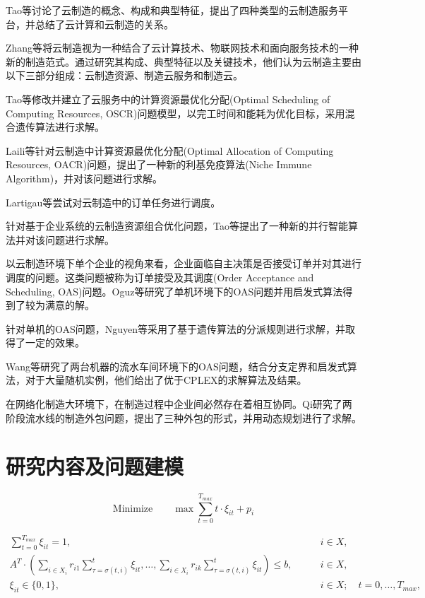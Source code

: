 \documentclass[UTF8]{ctexart}
\begin{document}
Tao等\cite{Tao2011}讨论了云制造的概念、构成和典型特征，提出了四种类型的云制造服务平台，并总结了云计算和云制造的关系。

Zhang等\cite{Zhang2014}将云制造视为一种结合了云计算技术、物联网技术和面向服务技术的一种新的制造范式。通过研究其构成、典型特征以及关键技术，他们认为云制造主要由以下三部分组成：云制造资源、制造云服务和制造云。

Tao等\cite{Tao2014}修改并建立了云服务中的计算资源最优化分配(Optimal Scheduling of Computing Resources, OSCR)问题模型，以完工时间和能耗为优化目标，采用混合遗传算法进行求解。

Laili等\cite{Laili2012}针对云制造中计算资源最优化分配(Optimal Allocation of Computing
Resources, OACR)问题，提出了一种新的利基免疫算法(Niche Immune Algorithm)，并对该问题进行求解。

Lartigau等\cite{6227791}尝试对云制造中的订单任务进行调度。

针对基于企业系统的云制造资源组合优化问题，Tao等\cite{6376181}提出了一种新的并行智能算法并对该问题进行求解。

以云制造环境下单个企业的视角来看，企业面临自主决策是否接受订单并对其进行调度的问题。这类问题被称为订单接受及其调度(Order Acceptance and Scheduling, OAS)问题。Oguz等\cite{Og2010}研究了单机环境下的OAS问题并用启发式算法得到了较为满意的解。

针对单机的OAS问题，Nguyen等\cite{Nguyen2015}采用了基于遗传算法的分派规则进行求解，并取得了一定的效果。

Wang等\cite{Wang2013}研究了两台机器的流水车间环境下的OAS问题，结合分支定界和启发式算法，对于大量随机实例，他们给出了优于CPLEX的求解算法及结果。

在网络化制造大环境下，在制造过程中企业间必然存在着相互协同。Qi\cite{Qi2011}研究了两阶段流水线的制造外包问题，提出了三种外包的形式，并用动态规划进行了求解。

\section{研究内容及问题建模}
\label{model}

\begin{equation}
\text{Minimize} \qquad \max\sum_{t=0}^{T_{max}} t\cdot\xi_{it} + p_i
\end{equation}


\begin{align}
\sum_{t=0}^{T_{max}} \xi_{it} = 1, \qquad & i \in X,\\
A^T\cdot \left(\sum_{i\in X_i} r_{i1} \sum_{\tau=\sigma(t,i)}^t \xi_{it}, \dots, \sum_{i\in X_i} r_{ik} \sum_{\tau=\sigma(t,i)}^t \xi_{it}\right) \leqslant b, \qquad & i \in X,\\
\xi_{it} \in \{0, 1\}, \qquad & i\in X;\quad t = 0, \dots, T_{max},
\end{align}


 
 
\end{document}
